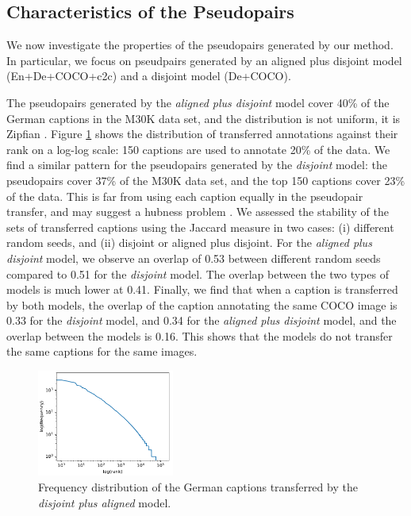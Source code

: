 \subsection{Characteristics of the Pseudopairs}


We now investigate the properties of the pseudopairs generated by our method. In particular, we focus on pseudpairs generated by an aligned plus disjoint model (En+De+COCO+c2c) and a disjoint model (De+COCO).

The pseudopairs generated by the \textit{aligned plus disjoint} model cover 40\% of the German captions in the M30K data set, and the distribution is not uniform, it is Zipfian \cite{zipf1949human}. Figure \ref{fig:annotation_freq} shows the distribution of transferred annotations against their rank on a log-log scale: 150 captions are used to annotate 20\% of the data. We find a similar pattern for the pseudopairs generated by the \textit{disjoint} model: the pseudopairs cover 37\% of the M30K data set, and the top 150 captions cover 23\% of the data. This is far from using each caption equally in the pseudopair transfer, and may suggest a hubness problem \cite{dinu2014improving}. We assessed the stability of the sets of transferred captions using the Jaccard measure in two cases: (i) different random seeds, and (ii) disjoint or aligned plus disjoint. For the \emph{aligned plus disjoint} model, we observe an overlap of 0.53 between different random seeds compared to 0.51 for the \emph{disjoint} model. The overlap between the two types of models is much lower at 0.41. Finally, we find that when a caption is transferred by both models, the overlap of the caption annotating the same COCO image is 0.33 for the \emph{disjoint} model, and 0.34 for the \emph{aligned plus disjoint} model, and the overlap between the models is 0.16. This shows that the models do not transfer the same captions for the same images.

\begin{figure}[t]
    \centering
    \includegraphics[width=0.4\textwidth]{chapters/EMNLP/assets/annotation_freq.pdf}
    \caption{Frequency distribution of the German captions transferred by the \textit{disjoint plus aligned} model.}
    \label{fig:annotation_freq}
\end{figure}

